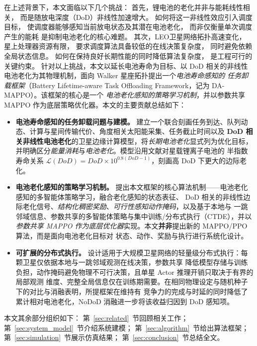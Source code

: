 \documentclass[a4paper,11pt]{article}
\begin{document}
在上述背景下，本文面临以下几个挑战：
首先，锂电池的老化并非与能耗线性相关，
而是随放电深度（DoD）非线性加速增大。
如何将这一非线性效应引入调度目标，
使调度器能够感知当前放电状态及其潜在电池老化，
而非仅衡量单次调度产生的能耗
是抑制电池老化的核心难题。
其次，LEO卫星网络拓扑高速变化，
星上处理器资源有限，
要求调度算法具备较低的在线决策复杂度，
同时避免依赖全局状态信息。
如何在保持良好长期性能的同时降低算法复杂度，
是工程可行的关键约束。
针对以上挑战，本文以延长电池寿命为目标、以 DoD 相关的非线性电池老化为其物理机制，面向 Walker 星座拓扑提出一个\emph{电池寿命感知的
任务卸载框架}（Battery Lifetime-aware Task Offloading Framework，记为 DA-MAPPO）。该框架的核心是一个
\emph{电池老化感知的策略学习机制}，并以参数共享 MAPPO 作为底层策略优化器。本文的主要贡献总结如下：
\begin{itemize}
    \item \textbf{电池寿命感知的任务卸载问题与建模。}
    建立一个联合刻画任务到达、队列动态、计算与星间传输代价、角度相关太阳能采集、任务截止时间以及
    \textbf{DoD 相关非线性电池老化}的卫星边缘计算模型，将\emph{长期电池老化}显式列为优化目标，
    并明确区分\emph{能量消耗}与\emph{电池老化}。模型沿用文献\cite{chen2025tasri}对星载锂离子电池的
    半指数寿命关系 $\mathcal{L}(DoD)=DoD\times10^{0.8(DoD-1)}$，刻画高 DoD 下更大的边际老化。

    \item \textbf{电池老化感知的策略学习机制。}
    提出本文框架的核心算法机制——电池老化感知的多智能体策略学习，融合老化感知的状态表征、
    DoD 相关的非线性边际老化信号、\emph{结构化稠密奖励}、\emph{可行性感知动作掩码}，以及基于本地与
    一跳邻域信息、参数共享的多智能体策略与集中训练/分布式执行（CTDE），并以\emph{参数共享
    MAPPO 作为底层优化器}实现。本文\textbf{并非}提出新的 MAPPO/PPO 算法，而是面向电池老化目标对
    状态、动作、奖励与执行进行系统化设计。

    \item \textbf{可扩展的分布式执行。}
    设计适用于大规模卫星网络的轻量级分布式执行：每颗卫星仅依据本地与一跳邻域观测在线决策，参数共享
    降低模型存储与训练负担，动作掩码避免物理不可行决策，且单星 Actor 推理开销只取决于有界的局部观测
    维度、完整全局信息仅在训练期需要。在相同物理设定与随机种子下的对比与消融表明，所提框架在维持有
    竞争力的完成与时延的同时降低了累计相对电池老化，NoDoD 消融进一步将该收益归因到 DoD 感知项。
\end{itemize}

本文其余部分组织如下：
第~\ref{sec:related}~节回顾相关工作；
第~\ref{sec:system_model}~节介绍系统建模；
第~\ref{sec:algorithm}~节给出算法框架；
第~\ref{sec:simulation}~节展示仿真结果；
第~\ref{sec:conclusion}~节总结全文。
\end{document}
